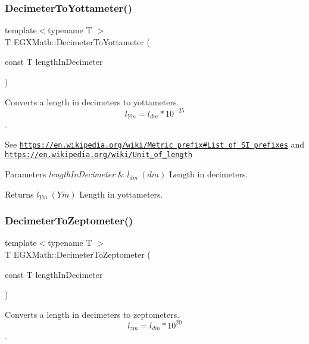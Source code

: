 \subsubsection{\texorpdfstring{Decimeter\+To\+Yottameter()}{DecimeterToYottameter()}}
{\footnotesize\ttfamily template$<$typename T $>$ \\
T E\+G\+X\+Math\+::\+Decimeter\+To\+Yottameter (\begin{DoxyParamCaption}\item[{const T}]{length\+In\+Decimeter }\end{DoxyParamCaption})}



Converts a length in decimeters to yottameters. \[ l_{Ym}=l_{dm} * 10^{-25} \]. 

See \href{https://en.wikipedia.org/wiki/Metric_prefix#List_of_SI_prefixes}{\tt https\+://en.\+wikipedia.\+org/wiki/\+Metric\+\_\+prefix\#\+List\+\_\+of\+\_\+\+S\+I\+\_\+prefixes} and \href{https://en.wikipedia.org/wiki/Unit_of_length}{\tt https\+://en.\+wikipedia.\+org/wiki/\+Unit\+\_\+of\+\_\+length} 
\begin{DoxyParams}{Parameters}
{\em length\+In\+Decimeter} & $ l_{dm}\ (dm)$ Length in decimeters. \\
\hline
\end{DoxyParams}
\begin{DoxyReturn}{Returns}
$ l_{Ym}\ (Ym)$ Length in yottameters. 
\end{DoxyReturn}
\mbox{\label{group___e_g_x_math-_conversions-_length_conversions-_s_i-_decimeter-_s_i_ga5462e9c56431f0cf1daeafb729eeed24}} 
\subsubsection{\texorpdfstring{Decimeter\+To\+Zeptometer()}{DecimeterToZeptometer()}}
{\footnotesize\ttfamily template$<$typename T $>$ \\
T E\+G\+X\+Math\+::\+Decimeter\+To\+Zeptometer (\begin{DoxyParamCaption}\item[{const T}]{length\+In\+Decimeter }\end{DoxyParamCaption})}



Converts a length in decimeters to zeptometers. \[ l_{zm}=l_{dm} * 10^{20} \]. 

